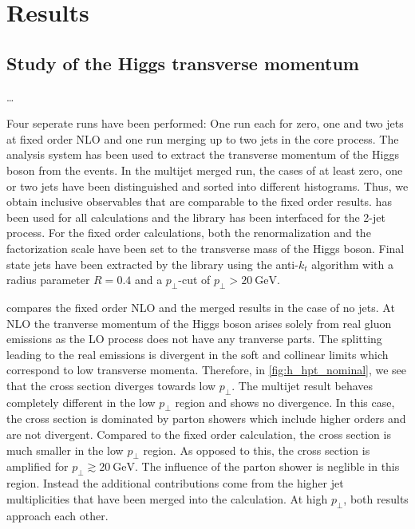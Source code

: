 
\chapter{Results}
%
\section{Study of the Higgs transverse momentum}
\ldots

Four seperate runs have been performed: One run each for zero, one and two jets at fixed order NLO and one \mcatnlo{} run merging up to two jets in the core process.
The \rivet{} analysis system has been used to extract the transverse momentum of the Higgs boson from the events.
In the multijet merged run, the cases of at least zero, one or two jets have been distinguished and sorted into different histograms.
Thus, we obtain inclusive observables that are comparable to the fixed order results.
\sherpa{} has been used for all calculations and the \mcfm{} library \cite{mcfm_hjj} has been interfaced for the 2-jet process.
For the fixed order calculations, both the renormalization and the factorization scale have been set to the transverse mass of the Higgs boson.
Final state jets have been extracted by the \fastjet{} library \cite{fastjet_manual} using the anti-$k_t$ algorithm \cite{anti_kt} with a radius parameter $R=0.4$ and a $p_\perp$-cut of $p_\perp > \SI{20}{\giga\electronvolt}$.

 compares the fixed order NLO and the merged \mcatnlo{} results in the case of no jets.
At NLO the tranverse momentum of the Higgs boson arises solely from real gluon emissions as the LO process does not have any tranverse parts.
The splitting leading to the real emissions is divergent in the soft and collinear limits which correspond to low transverse momenta.
Therefore, in \cref{fig:h_hpt_nominal}, we see that the cross section diverges towards low $p_\perp$.
The multijet result behaves completely different in the low $p_\perp$ region and shows no divergence.
In this case, the cross section is dominated by parton showers which include higher orders and are not divergent.
Compared to the fixed order calculation, the cross section is much smaller in the low $p_\perp$ region.
As opposed to this, the cross section is amplified for $p_\perp \gtrsim \SI{20}{\giga\electronvolt}$.
The influence of the parton shower is neglible in this region.
Instead the additional contributions come from the higher jet multiplicities that have been merged into the calculation.
At high $p_\perp$, both results approach each other.

